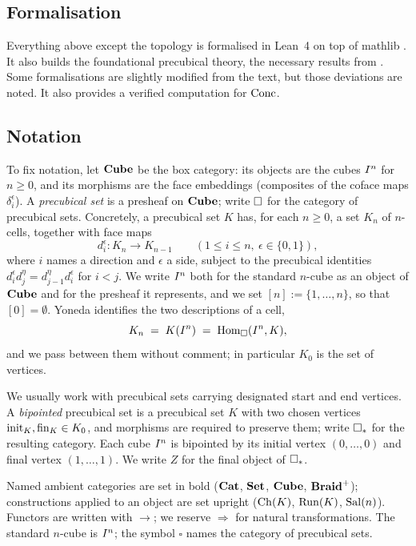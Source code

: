 \documentclass[11pt]{article}
\begin{document}
\subsection{Formalisation}

Everything above except the topology is formalised in Lean~4 on top of mathlib \cite{Cubical}.
It also builds the foundational precubical theory, the necessary results from \cite{PZ}.
Some formalisations are slightly modified from the text, but those deviations are noted.
It also provides a verified computation for $\operatorname{Conc}$.

\subsection{Notation}

To fix notation, let $\mathbf{Cube}$ be the box category: its objects are the cubes $I^{n}$ for
$n \ge 0$, and its morphisms are the face embeddings (composites of the coface maps
$\delta_i^\epsilon$). A \emph{precubical set} is a presheaf on $\mathbf{Cube}$; write $\square$ for the
category of precubical sets. Concretely, a precubical set $K$ has, for each $n \ge 0$, a set $K_n$
of $n$-cells, together with face maps
\[
  d_i^\epsilon : K_n \to K_{n-1} \qquad (1 \le i \le n,\ \epsilon \in \{0,1\}),
\]
where $i$ names a direction and $\epsilon$ a side, subject to the precubical identities
$d_i^\epsilon d_j^\eta = d_{j-1}^\eta d_i^\epsilon$ for $i < j$. We write $I^{n}$ both for the
standard $n$-cube as an object of $\mathbf{Cube}$ and for the presheaf it represents, and we set
$[n] := \{1, \dots, n\}$, so that $[0] = \emptyset$. Yoneda identifies the two descriptions of a
cell,
\[
  K_n \;=\; K(I^{n}) \;=\; \operatorname{Hom}_{\square}(I^{n}, K),
\]
and we pass between them without comment; in particular $K_0$ is the set of vertices.

We usually work with precubical sets carrying designated start and end vertices. A \emph{bipointed}
precubical set is a precubical set $K$ with two chosen vertices $\operatorname{init}_K, \operatorname{fin}_K \in K_0$,
and morphisms are required to preserve them; write $\square_{*}$ for the resulting category. Each cube
$I^{n}$ is bipointed by its initial vertex $(0,\dots,0)$ and final vertex $(1,\dots,1)$. We
write $Z$ for the final object of $\square_{*}$.

\begin{convention}
Named ambient categories are set in bold ($\mathbf{Cat}$, $\mathbf{Set}$, $\mathbf{Cube}$, $\mathbf{Braid}^{+}$); constructions applied
to an object are set upright ($\operatorname{Ch}(K)$, $\operatorname{Run}(K)$, $\operatorname{Sal}(n)$). Functors are written with $\to$; we
reserve $\Rightarrow$ for natural transformations. The standard $n$-cube is $I^{n}$;
the symbol $\square$ names the category of precubical sets.
\end{convention}
\end{document}
